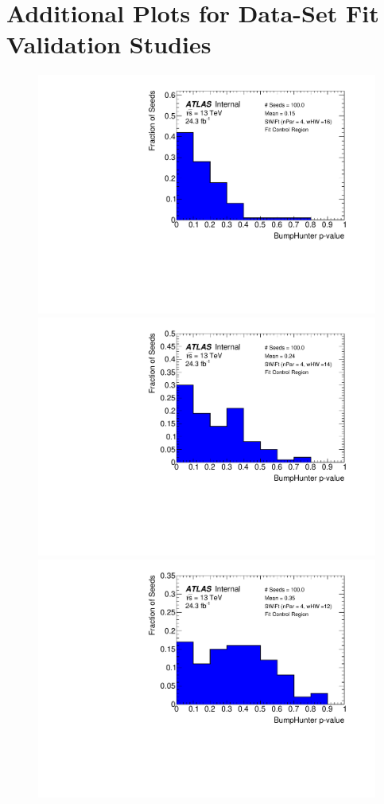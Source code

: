 \chapter{\vspace{-1em}Additional Plots for \lm{} Data-Set Fit Validation Studies}
\label{app:lowMass_Swift}
\vspace{-3em}

\begin{figure}[!htb]
\captionsetup[subfigure]{aboveskip=0pt,justification=centering}
\centering
{} {
  \includegraphics[width=0.32\linewidth, angle=0]{figs/Dibjet/LowMass/FitStudy_min566/pVal_bumpHunter_corrFitCR_4para_low16_high16.pdf}
}\hspace{-3mm}                                       
 {                                                    
  \includegraphics[width=0.32\linewidth, angle=0]{figs/Dibjet/LowMass/FitStudy_min566/pVal_bumpHunter_corrFitCR_4para_low14_high14.pdf}
}\hspace{-3mm}                                       
 {                                                    
  \includegraphics[width=0.32\linewidth, angle=0]{figs/Dibjet/LowMass/FitStudy_min566/pVal_bumpHunter_corrFitCR_4para_low12_high12.pdf}
}
\end{figure}

